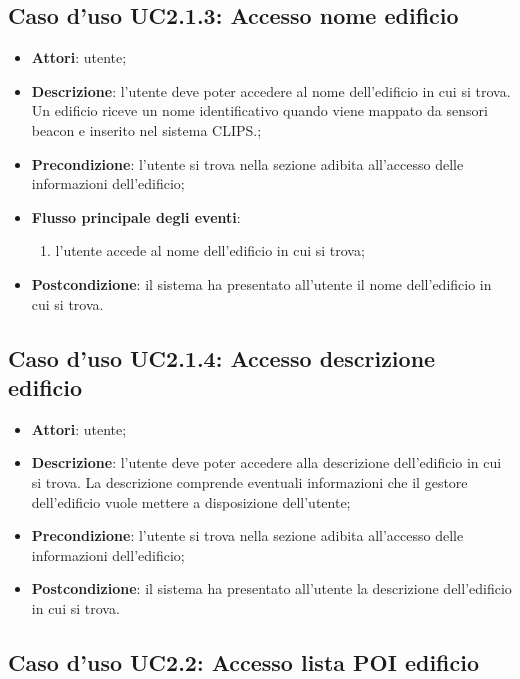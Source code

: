 \documentclass[../AnalisiDeiRequisiti.tex]{subfiles}
\begin{document}
\subsection{Caso d'uso UC2.1.3: Accesso nome edificio}

\begin{itemize}
\item \textbf{Attori}: utente;
\item \textbf{Descrizione}: l'utente deve poter accedere al nome dell'edificio in cui si trova. Un edificio riceve un nome identificativo quando viene mappato da sensori beacon e inserito nel sistema CLIPS.; 
      \item \textbf{Precondizione}: l'utente si trova nella sezione adibita all'accesso delle informazioni dell'edificio;

        \item \textbf{Flusso principale degli eventi}:
          \begin{enumerate}
          \item l'utente accede al nome dell'edificio in cui si trova;

      \end{enumerate}
    \item \textbf{Postcondizione}: il sistema ha presentato all'utente il nome dell'edificio in cui si trova.
  \end{itemize}
\hypertarget{UC2.1.4}{}
\subsection{Caso d'uso UC2.1.4: Accesso descrizione edificio}
\begin{itemize}
\item \textbf{Attori}: utente;
\item \textbf{Descrizione}: l'utente deve poter accedere alla descrizione dell'edificio in cui si trova. La descrizione comprende eventuali informazioni che il gestore dell'edificio vuole mettere a disposizione dell'utente; 
      \item \textbf{Precondizione}: l'utente si trova nella sezione adibita all'accesso delle informazioni dell'edificio;
    \item \textbf{Postcondizione}: il sistema ha presentato all'utente la descrizione dell'edificio in cui si trova.
  \end{itemize}
\hypertarget{UC2.2}{}
\subsection{Caso d'uso UC2.2: Accesso lista POI edificio}
\end{document}
